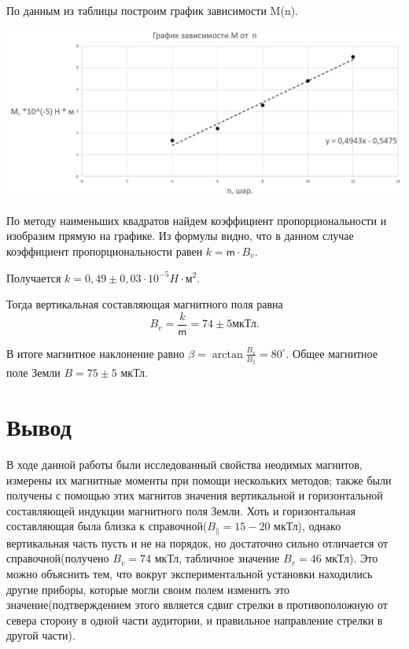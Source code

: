 \documentclass[a4paper,12pt]{article}
\begin{document}
По данным из таблицы построим график зависимости M(n).

\begin{center}
  \includegraphics[scale=0.7]{graphik2.jpg}
  \label{fig:picture}
\end{center}

По методу наименьших квадратов найдем коэффициент пропорциональности и изобразим прямую на графике. Из формулы видно, что в данном случае коэффициент пропорциональности равен $k = \textsf{m} \cdot B_{v}$.

Получается $k = 0,49 \pm 0,03 \cdot 10^{-5} H \cdot \text{м}^2$. 

Тогда вертикальная составляющая магнитного поля равна
\[B_v = \frac{k}{\textsf{m}} = 74 \pm 5 \text{мкТл.}\]

В итоге магнитное наклонение равно $\beta = \arctan{\frac{B_v}{B_\parallel}} = 80^{\circ}$. Общее магнитное поле Земли $B = 75 \pm 5$ мкТл.

\section*{Вывод}
В ходе данной работы были исследованный свойства неодимых магнитов, измерены их магнитные моменты при помощи нескольких методов; также были получены с помощью этих магнитов значения вертикальной и горизонтальной составляющей индукции магнитного поля Земли. Хоть и горизонтальная составляющая была близка к справочной($B_{\parallel} =  15-20$ мкТл), однако вертикальная часть пусть и не на порядок, но достаточно сильно отличается от справочной(получено $B_v = 74$ мкТл, табличное значение $B_v = 46$ мкТл). Это можно объяснить тем, что вокруг экспериментальной установки находились другие приборы, которые могли своим полем изменить это значение(подтверждением этого является сдвиг стрелки в противоположную от севера сторону в одной части аудитории, и правильное направление стрелки в другой части).
\end{document}
